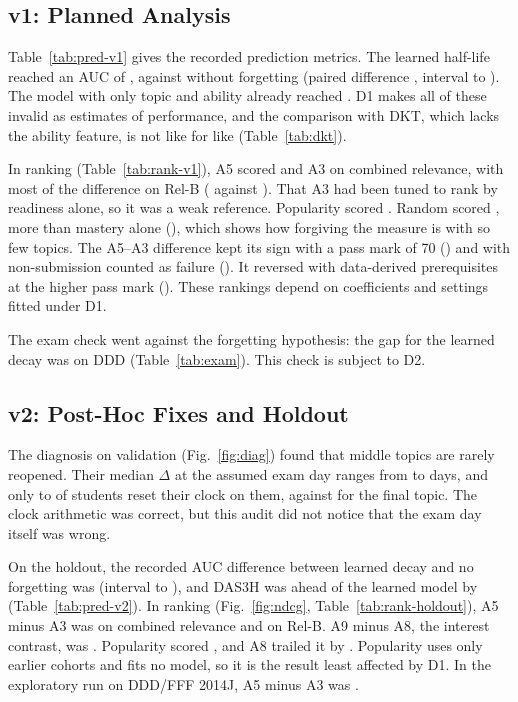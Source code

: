 \documentclass[conference]{IEEEtran}
\begin{document}
\subsection{v1: Planned Analysis}
Table~\ref{tab:pred-v1} gives the recorded prediction metrics. The learned half-life reached an AUC of \AucLearned, against \AucNone{} without forgetting (paired difference \AucGain, interval \AucGainLo{} to \AucGainHi). The model with only topic and ability already reached \AucTopicOne. D1 makes all of these invalid as estimates of performance, and the comparison with DKT, which lacks the ability feature, is not like for like (Table~\ref{tab:dkt}).

In ranking (Table~\ref{tab:rank-v1}), A5 scored \RankFive{} and A3 \RankThree{} on combined relevance, with most of the difference on Rel-B (\RankFiveB{} against \RankThreeB). That A3 had been tuned to rank by readiness alone, so it was a weak reference. Popularity scored \RankPop. Random scored \RankRandom, more than mastery alone (\RankMastery), which shows how forgiving the measure is with so few topics. The A5--A3 difference kept its sign with a pass mark of 70 (\SensSeventy) and with non-submission counted as failure (\SensNonsub). It reversed with data-derived prerequisites at the higher pass mark (\SensData). These rankings depend on coefficients and settings fitted under D1.

The exam check went against the forgetting hypothesis: the gap for the learned decay was \ExamGap{} on DDD (Table~\ref{tab:exam}). This check is subject to D2.



\subsection{v2: Post-Hoc Fixes and Holdout}
The diagnosis on validation (Fig.~\ref{fig:diag}) found that middle topics are rarely reopened. Their median $\Delta$ at the assumed exam day ranges from \DeltaFive{} to \DeltaTwo{} days, and only \ResetFive{} to \ResetThree{} of students reset their clock on them, against \ResetSix{} for the final topic. The clock arithmetic was correct, but this audit did not notice that the exam day itself was wrong.

On the holdout, the recorded AUC difference between learned decay and no forgetting was \HoldGain{} (interval \HoldGainLo{} to \HoldGainHi), and DAS3H was ahead of the learned model by \HoldDasGap{} (Table~\ref{tab:pred-v2}). In ranking (Fig.~\ref{fig:ndcg}, Table~\ref{tab:rank-holdout}), A5 minus A3 was \HoldForget{} on combined relevance and \HoldForgetB{} on Rel-B. A9 minus A8, the interest contrast, was \HoldInterest. Popularity scored \HoldPop, and A8 trailed it by \HoldPopGap. Popularity uses only earlier cohorts and fits no model, so it is the result least affected by D1. In the exploratory run on DDD/FFF 2014J, A5 minus A3 was \PostForget.
\end{document}
